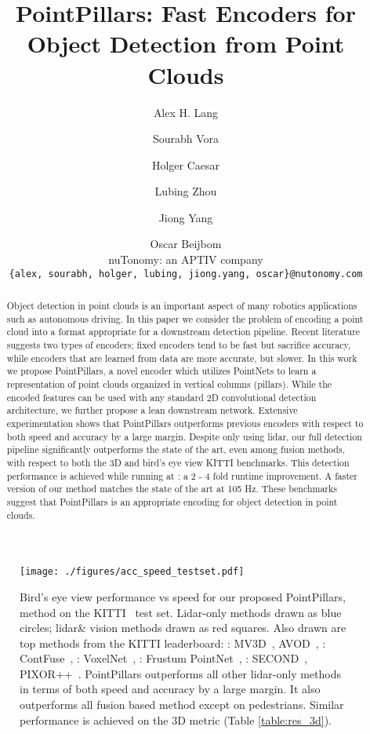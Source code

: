 \documentclass[10pt,twocolumn,letterpaper]{article}
\newcommand{\hertz}{\xspace} \newcommand{\maxhertz}{\xspace} \newcommand{\decorate}{9\xspace} \newcommand{\maxpillars}{12000\xspace} \newcommand{\maxpts}{100\xspace} \newcommand{\xyres}{0.16\xspace} \newcommand{\lidar}{lidar\xspace}
\newcommand{\tableref}[1]{Table \ref{#1}}
\newcommand{\squeeze}{\vspace{-0.5mm}}
\begin{document}
\title{PointPillars: Fast Encoders for Object Detection from Point Clouds}

\author{
Alex H. Lang \and Sourabh Vora \and  Holger Caesar \and  Lubing Zhou \and  Jiong Yang \and  Oscar Beijbom \\
nuTonomy: an APTIV company\\
{\tt\small \{alex, sourabh, holger, lubing, jiong.yang, oscar\}@nutonomy.com}
}



\maketitle


\begin{abstract}
Object detection in point clouds is an important aspect of many robotics applications such as autonomous driving. 
In this paper we consider the problem of encoding a point cloud into a format appropriate for a downstream detection pipeline.
Recent literature suggests two types of encoders; fixed encoders tend to be fast but sacrifice accuracy, while encoders that are learned from data are more accurate, but slower.
In this work we propose PointPillars, a novel encoder which utilizes PointNets to learn a representation of point clouds organized in vertical columns (pillars).
While the encoded features can be used with any standard 2D convolutional detection architecture, we further propose a lean downstream network.
Extensive experimentation shows that PointPillars outperforms previous encoders with respect to both speed and accuracy by a large margin.
Despite only using lidar, our full detection pipeline significantly outperforms the state of the art, even among fusion methods, with respect to both the 3D and bird's eye view KITTI benchmarks.
This detection performance is achieved while running at \hertz: a 2 - 4 fold runtime improvement.
A faster version of our method matches the state of the art at 105 Hz.
These benchmarks suggest that PointPillars is an appropriate encoding for object detection in point clouds.
\end{abstract}

\begin{figure}
\begin{center}
\texttt{[image: ./figures/acc\_speed\_testset.pdf]}
\end{center}
\squeeze
\caption{Bird's eye view performance vs speed for our proposed PointPillars,  method on the KITTI~\cite{kitti} test set.
Lidar-only methods drawn as blue circles; \lidar \& vision methods drawn as red squares.
Also drawn are top methods from the KITTI leaderboard: : MV3D~\cite{mv3d},  AVOD~\cite{avod}, : ContFuse~\cite{contfuse}, : VoxelNet~\cite{voxelnet}, : Frustum PointNet~\cite{frustum}, : SECOND~\cite{second},  PIXOR++~\cite{hdnet}.
PointPillars outperforms all other \lidar-only methods in terms of both speed and accuracy by a large margin.
It also outperforms all fusion based method except on pedestrians. 
Similar performance is achieved on the 3D metric (\tableref{table:res_3d}). 
 }
\label{fig:speed_accuracy}
\end{figure}
\end{document}
